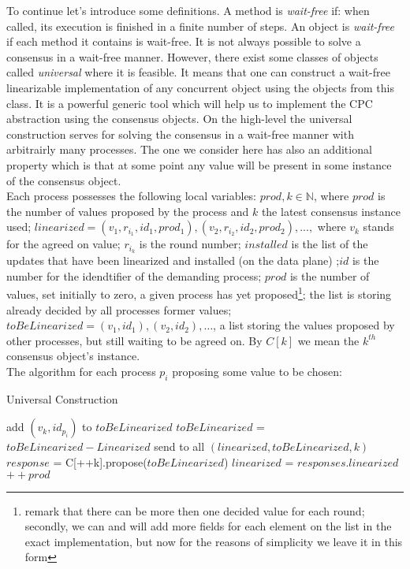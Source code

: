 \documentclass{article}
\theoremstyle{remark}
\begin{document}
To continue let's introduce some definitions. A method is \emph{wait-free} if: when called, its execution is finished in a finite number of steps. An object is \emph{wait-free} if each method it contains is wait-free. 
It is not always possible to solve a consensus in a wait-free manner. However, there exist some classes of objects called \emph{universal} where it is feasible. It means that one can construct a wait-free linearizable implementation of any concurrent object using the objects from this class. It is a powerful generic tool which will help us to implement the CPC abstraction using the consensus objects.  
On the high-level the universal construction serves for solving the consensus in a wait-free manner with arbitrairly many processes. The one we consider here has also an additional property which is that at some point any value will be present in some instance of the consensus object.\\
Each process possesses the following local variables: $prod,k\in\mathbb{N}$, where $prod$ is the number of values proposed by the process and $k$ the latest consensus instance used; $linearized=(v_1,r_{i_1},id_1,prod_1),(v_2,r_{i_2},id_2,prod_2),...,$ where $v_k$ stands for the agreed on value; $r_{i_k}$ is the round number; $installed$ is the list of the updates that have been linearized and installed (on the data plane) ;$id$ is the number for the idendtifier of the demanding process; $prod$ is the number of values, set initially to zero, a given process has yet proposed\footnote{remark that there can be more then one decided value for each round; secondly, we can and will add more fields for each element on the list in the exact implementation, but now for the reasons of simplicity we leave it in this form}; the list is storing already decided by all processes former values; $toBeLinearized = (v_1,id_1),(v_2,id_2),\ldots$, a list storing the values proposed by other processes, but still waiting to be agreed on. By $C[k]$ we mean the $k^{th}$ consensus object's instance. \\
The algorithm for each process $p_i$ proposing some value to be chosen:
\begin{algorithm}
  \caption{Universal Construction}\label{Universal}
  \begin{algorithmic}[1]
   \State add $(v_k,id_{p_i})$ to $toBeLinearized$
   \State $toBeLinearized$ = $toBeLinearized - Linearized$
   \State send to all $(linearized, toBeLinearized,k)$
   	\Repeat
   		\State $response$ = C[++k].propose($toBeLinearized$)
   		\State $linearized$ = $responses.linearized$
   	\State $++prod$
  \end{algorithmic}
\end{algorithm}
\end{document}
